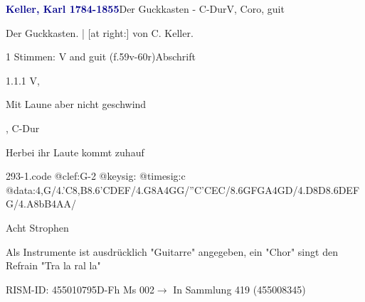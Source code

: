 \documentclass[twocolumn]{book}
\begin{document}
\par \vspace{7pt} \textcolor{darkblue}{\textbf{Keller, Karl  1784-1855}}\hfillplus{\textbf{[293]}}\newline Der Guckkasten - C-Dur\newline V, Coro, guit
\par \begin{itshape}[heading, f.59v:] Der Guckkasten. | [at right:] von C. Keller.\end{itshape} 
\par \textcolor{darkblue}{}  1 Stimmen: V and guit  (f.59v-60r)\newline Abschrift
\par 1.1.1  V, \begin{itshape}Mit Laune aber nicht geschwind\end{itshape}, C-Dur\newline \begin{footnotesize} Herbei ihr Laute kommt zuhauf \end{footnotesize}  
\begin{filecontents*}{293-1.code}
@clef:G-2
@keysig:
@timesig:c
@data:4,G/4.'C8,B{8.6'CD}{EF}/4.G8A4GG/''C'CEC/8.6{GF}GA4GD/4.D8D{8.6DE}{FG}/4.A8bB4AA/
\end{filecontents*}
\newline
%
\par Acht Strophen
\par Als Instrumente ist ausdrücklich "Guitarre" angegeben, ein "Chor" singt den Refrain "Tra la ral la"
\par RISM-ID: 455010795\newline D-Fh  Ms 002\newline $\rightarrow$ In Sammlung 419 (455008345)
      
\end{document}
